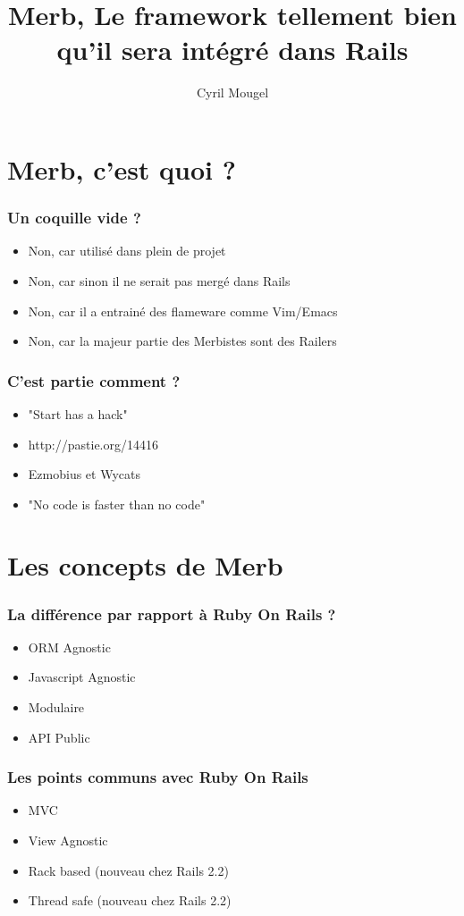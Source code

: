 \documentclass{beamer}
\title{Merb, Le framework tellement bien qu'il sera intégré dans Rails}
\author{Cyril Mougel}
\begin{document}
\begin{frame}
    \titlepage
\end{frame}

\section{Merb, c'est quoi ?}

\begin{frame}
	\frametitle{Un coquille vide ?}
	\begin{itemize}
		\item Non, car utilisé dans plein de projet
		\item Non, car sinon il ne serait pas mergé dans Rails
		\item Non, car il a entrainé des flameware comme Vim/Emacs
        \item Non, car la majeur partie des Merbistes sont des Railers
	\end{itemize}
\end{frame}

\begin{frame}
    \frametitle{C'est partie comment ?}
    \begin{itemize}
        \item "Start has a hack"
        \item http://pastie.org/14416
        \item Ezmobius et Wycats
        \item "No code is faster than no code"
    \end{itemize}
\end{frame}

\section{Les concepts de Merb}

\begin{frame}
    \frametitle{La différence par rapport à Ruby On Rails ?}
    \begin{itemize}
        \item ORM Agnostic
        \item Javascript Agnostic
        \item Modulaire
        \item API Public
    \end{itemize}
\end{frame}

\begin{frame}
    \frametitle{Les points communs avec Ruby On Rails}
    \begin{itemize}
        \item MVC
        \item View Agnostic
        \item Rack based (nouveau chez Rails 2.2)
        \item Thread safe (nouveau chez Rails 2.2)
    \end{itemize}
\end{frame}
\end{document}
